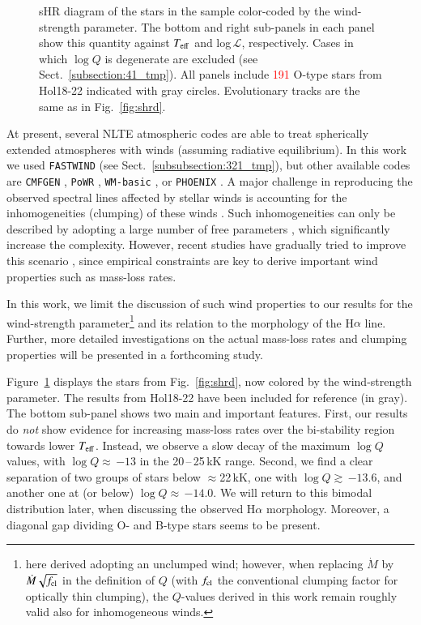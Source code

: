 \documentclass{aa}
\newcommand{\Teff}{\mbox{$T_{\rm eff}$}\xspace}
\newcommand{\logQ}{\mbox{$\log Q$}\xspace}
\newcommand{\Ls}{$ \mathcal{L}$\xspace}
\newcommand{\num}[1]{\textcolor{red}{#1}}
\newcommand{\gs}{\mbox{$\gtrsim$}\,}
\begin{document}
\begin{figure}[!t]
\centering
{}
\caption{sHR diagram of the stars in the sample color-coded by the wind-strength parameter. The bottom and right sub-panels in each panel show this quantity against \Teff and log\,\Ls, respectively. Cases in which \logQ is degenerate are excluded (see Sect.~\ref{subsection:41_tmp}). All panels include \num{191} O-type stars from Hol18-22 indicated with gray circles. Evolutionary tracks are the same as in Fig.~\ref{fig:shrd}.} 
\label{fig:shrd_logq}
\end{figure}

At present, several NLTE atmospheric codes are able to treat spherically extended atmospheres with winds (assuming radiative equilibrium). In this work we used {\tt FASTWIND} (see Sect.~\ref{subsubsection:321_tmp}), but other available codes are {\tt CMFGEN} \citep{hillier98}, {\tt PoWR} \citep{grafener02, hamann04}, {\tt WM-basic} \citep{pauldrach01}, or {\tt PHOENIX} \citep{hauschildt92}. A major challenge in reproducing the observed spectral lines affected by stellar winds is accounting for the inhomogeneities (clumping) of these winds \citep[see][and references therein]{puls08}. Such inhomogeneities can only be described by adopting a large number of free parameters \citep[particularly, when modeling optically thick clumping, see,][]{sundqvist18}, which significantly increase the complexity. However, recent studies have gradually tried to improve this scenario \citep[see, e.g.,][]{hawcroft21, brands22}, since empirical constraints are key to derive important wind properties such as mass-loss rates.

In this work, we limit the discussion of such wind properties to our results for the wind-strength parameter\footnote{here derived adopting an unclumped wind; however, when replacing $\dot{M}$ by $\dot{M} \sqrt{f_{\rm cl}}$  in the definition of $Q$ (with $f_{\rm cl}$ the conventional clumping factor for optically thin clumping), the $Q$-values derived in this work remain roughly valid also for inhomogeneous winds.} and its relation to the morphology of the H$\alpha$ line. Further, more detailed investigations on the actual mass-loss rates and clumping properties will be presented in a forthcoming study.

Figure~\ref{fig:shrd_logq} displays the stars from Fig.~\ref{fig:shrd}, now colored by the wind-strength parameter. The results from Hol18-22 have been included for reference (in gray). The bottom sub-panel shows two main and important features. First, our results do \textit{not} show evidence for increasing mass-loss rates over the bi-stability region towards lower \Teff. Instead, we observe a slow decay of the maximum \logQ values, with \logQ$\approx$\,$-13$ in the 20\,--\,25\,kK range. Second, we find a clear separation of two groups of stars below $\approx$22\,kK, one with \logQ\gs$-13.6$, and another one at (or below) \logQ$\approx$\,$-14.0$. We will return to this bimodal distribution later, when discussing the observed H$\alpha$ morphology. Moreover, a diagonal gap dividing O- and B-type stars seems to be present.
\end{document}
